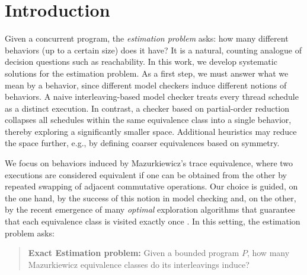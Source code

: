 \documentclass[acmsmall]{acmart}
\begin{document}


\maketitle


\section{Introduction}

Given a concurrent program, the \emph{estimation problem} asks: how many different behaviors (up to a certain size) does it have?
It is a natural, counting analogue of decision questions such as reachability.
%
In this work, we develop systematic solutions for the estimation problem.
As a first step, we must answer what we mean by a behavior, since 
different model checkers induce different notions of behaviors.
A naive interleaving-based model checker treats every thread schedule as a distinct execution.
In contrast, a checker based on partial-order reduction \cite{GodefroidThesis, spin, dpor, verisoft,pop-dpor,optimal-dpor,nidhugg,trust} 
collapses all schedules within the same equivalence class into a single behavior, 
thereby exploring a significantly smaller space.
Additional heuristics may reduce the space further, e.g., by defining coarser equivalences based on symmetry.

We focus on behaviors induced by Mazurkiewicz's trace equivalence, where two executions are considered equivalent
if one can be obtained from the other by repeated swapping of adjacent commutative operations.
Our choice is guided, on the one hand, by the success of this notion in model checking
\cite{spin, verisoft, dpor,optimal-dpor, trust}
and, on the other, by the recent emergence of many \emph{optimal} exploration algorithms that guarantee that each equivalence class is visited exactly 
once \cite{optimal-dpor, trust, must}.
In this setting, the estimation problem asks:
\begin{quote}
{\bf Exact Estimation problem:} Given a bounded program \(P\), how many Mazurkiewicz equivalence classes do its interleavings induce?
\end{quote}
\end{document}
